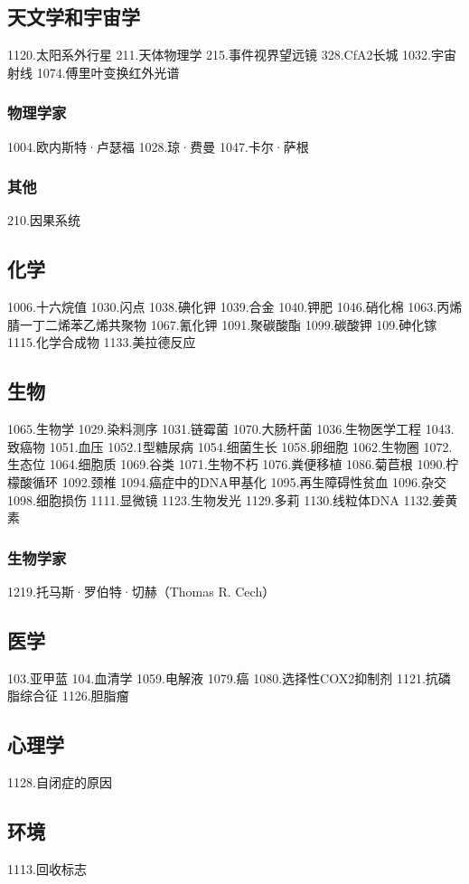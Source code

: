 \subsection{天文学和宇宙学}
1120.太阳系外行星
211.天体物理学
215.事件视界望远镜
328.CfA2长城
1032.宇宙射线
1074.傅里叶变换红外光谱
\subsubsection{物理学家}
1004.欧内斯特·卢瑟福
1028.琼·费曼
1047.卡尔·萨根
\subsubsection{其他}
210.因果系统

\subsection{化学}
1006.十六烷值
1030.闪点
1038.碘化钾
1039.合金
1040.钾肥
1046.硝化棉
1063.丙烯腈一丁二烯苯乙烯共聚物
1067.氰化钾
1091.聚碳酸酯
1099.碳酸钾
109.砷化镓
1115.化学合成物
1133.美拉德反应

\subsection{生物}
1065.生物学
1029.染料测序
1031.链霉菌
1070.大肠杆菌
1036.生物医学工程
1043.致癌物
1051.血压
1052.1型糖尿病
1054.细菌生长
1058.卵细胞
1062.生物圈
1072.生态位
1064.细胞质
1069.谷类
1071.生物不朽
1076.粪便移植
1086.菊苣根
1090.柠檬酸循环
1092.颈椎
1094.癌症中的DNA甲基化
1095.再生障碍性贫血
1096.杂交
1098.细胞损伤
1111.显微镜
1123.生物发光
1129.多莉
1130.线粒体DNA
1132.姜黄素
\subsubsection{生物学家}
1219.托马斯·罗伯特·切赫（Thomas R. Cech）

\subsection{医学}
103.亚甲蓝
104.血清学
1059.电解液
1079.癌
1080.选择性COX2抑制剂
1121.抗磷脂综合征
1126.胆脂瘤

\subsection{心理学}
1128.自闭症的原因

\subsection{环境}
1113.回收标志


